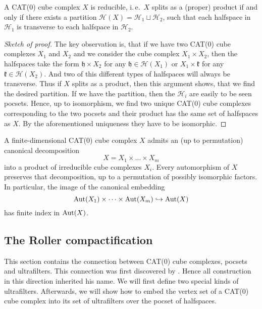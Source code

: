 \begin{prop}
  A CAT(0) cube complex \(X\) is reducible, i.\,e.\ \(X\) splits as a (proper) product if and only if  there  exists a partition \(\mathcal{H}(X) = \mathcal{H}_1 \sqcup \mathcal{H}_2\), such that each halfspace in \(\mathcal{H}_1\) is transverse to each halfspace in \(\mathcal{H}_2\).
\end{prop}

\begin{proof}[Sketch of proof]
  The key observation is, that if we have two CAT(0) cube complexes \(X_1\) and \(X_2\) and we consider the cube complex \(X_1 \times X_2\), then the halfspaces take the form \(\mathfrak{h} \times X_2\) for any \(\mathfrak{h} \in \mathcal{H}(X_1)\) or \(X_1 \times \mathfrak{k}\) for any \(\mathfrak{k} \in \mathcal{H}(X_2)\). And two of this different types of halfspaces will always be transverse. Thus if \(X\) splits as a product, then this argument shows, that we find the desired partition. If we have the partition, then the \(\mathcal{H}_i\) are easily to be seen pocsets. Hence, up to isomorphism, we find two unique CAT(0) cube complexes corresponding to the two pocsets and their product has the same set of halfspaces as \(X\). By the aforementioned uniqueness they have to be isomorphic.
\end{proof}

\begin{prop}
  \label{prop:cs-2.6}
  A finite-dimensional CAT(0) cube complex \(X\) admits an (up to permutation) canonical decomposition
  \[
    X = X_1 \times \dots \times X_m
  \]
  into a product of irreducible cube complexes \(X_i\). Every automorphism of \(X\) preserves that decomposition, up to a permutation of possibly isomorphic factors. In particular, the image of the canonical embedding
  \[
    \operatorname{Aut}(X_1) \times \dots \times \operatorname{Aut}(X_m) \hookrightarrow \operatorname{Aut}(X)
  \]
  has finite index in \(\operatorname{Aut}(X)\).
\end{prop}

\subsection{The Roller compactification}
\label{sec:rb}

This section contains the connection between CAT(0) cube complexes, pocsets and ultrafilters. This connection was first discovered by \textcite{Roller1999}. Hence all construction in this direction inherited his name. We will first define two special kinds of ultrafilters. Afterwards, we will show how to embed the vertex set of a CAT(0) cube complex into its set of ultrafilters over the pocset of halfspaces. 

